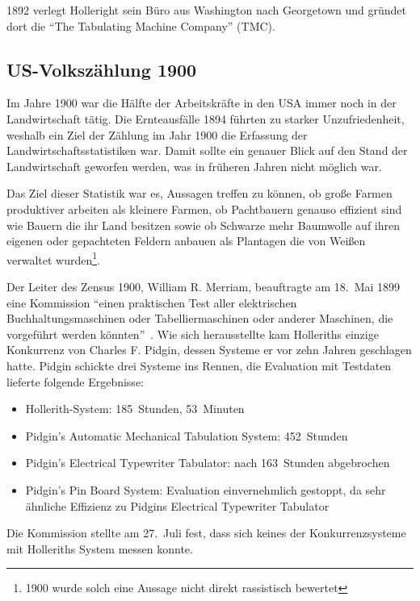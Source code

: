 \documentclass[parskip=half]{scrartcl}
\begin{document}
1892 verlegt Holleright sein Büro aus Washington nach Georgetown und gründet
dort die \enquote{The Tabulating Machine Company} (TMC).


\subsection{US-Volkszählung 1900}
\label{sec:1900}

Im Jahre 1900 war die Hälfte der Arbeitskräfte in den USA immer noch in der
Landwirtschaft tätig. Die Ernteausfälle 1894 führten zu starker
Unzufriedenheit, weshalb ein Ziel der Zählung im Jahr 1900 die Erfassung der
Landwirtschaftsstatistiken war. Damit sollte ein genauer Blick auf den Stand der
Landwirtschaft geworfen werden, was in früheren Jahren nicht möglich war.

Das Ziel dieser Statistik war es, Aussagen treffen zu können, ob große Farmen
produktiver arbeiten als kleinere Farmen, ob Pachtbauern genauso effizient sind wie
Bauern die ihr Land besitzen sowie ob Schwarze mehr Baumwolle auf ihren eigenen
oder gepachteten Feldern anbauen als Plantagen die von Weißen verwaltet
wurden\footnote{1900 wurde solch eine Aussage nicht direkt rassistisch
bewertet}.

Der Leiter des Zensus 1900, William R. Merriam, beauftragte am 18.~Mai 1899
eine Kommission \enquote{einen praktischen Test aller elektrischen
Buchhaltungsmaschinen oder Tabelliermaschinen oder anderer Maschinen, die
vorgeführt werden könnten}~\cite{austrian1982herman}. Wie sich herausstellte
kam Holleriths einzige Konkurrenz von Charles F. Pidgin, dessen Systeme er vor
zehn Jahren geschlagen hatte. Pidgin schickte drei Systeme ins Rennen, die
Evaluation mit Testdaten lieferte folgende Ergebnisse:

\begin{itemize}
  \item Hollerith-System: 185~Stunden, 53~Minuten
  \item Pidgin's Automatic Mechanical Tabulation System: 452~Stunden
  \item Pidgin's Electrical Typewriter Tabulator: nach 163~Stunden abgebrochen
  \item Pidgin's Pin Board System: Evaluation einvernehmlich gestoppt, da sehr
    ähnliche Effizienz zu Pidgins Electrical Typewriter Tabulator
\end{itemize}

Die Kommission stellte am 27.~Juli fest, dass sich keines der Konkurrenzsysteme
mit Holleriths System messen konnte.
\end{document}
